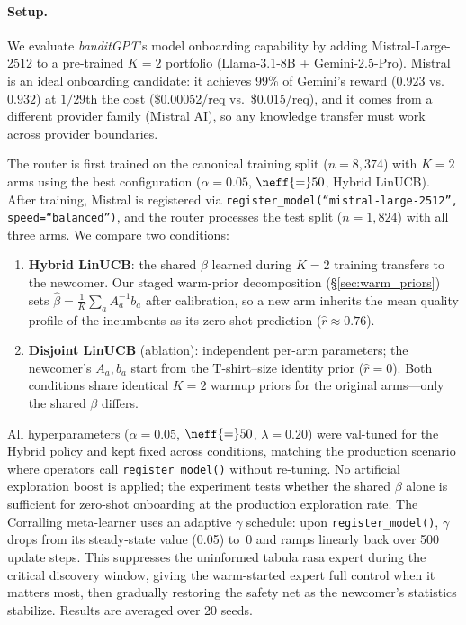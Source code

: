 
\paragraph{Setup.}
We evaluate \textit{banditGPT}'s model onboarding capability by
adding Mistral-Large-2512 to a pre-trained $K{=}2$ portfolio
(Llama-3.1-8B + Gemini-2.5-Pro).
Mistral is an ideal onboarding candidate: it achieves 99\% of
Gemini's reward ($0.923$ vs.\ $0.932$) at $1/29$th the cost
(\$0.00052/req vs.\ \$0.015/req), and it comes from a different
provider family (Mistral AI), so any knowledge transfer must work
across provider boundaries.

The router is first trained on the canonical training split
($n{=}8{,}374$) with $K{=}2$ arms using the best
configuration ($\alpha{=}0.05$, $\neff{=}50$, Hybrid LinUCB).
After training, Mistral is registered via
\texttt{register\_model(``mistral-large-2512'', speed=``balanced'')},
and the router processes the test split ($n{=}1{,}824$) with all
three arms.  We compare two conditions:
\begin{enumerate}[nosep]
    \item \textbf{Hybrid LinUCB}: the shared $\beta$ learned during
          $K{=}2$ training transfers to the newcomer.
          Our staged warm-prior decomposition
          (\S\ref{sec:warm_priors}) sets
          $\hat{\beta} = \frac{1}{K}\sum_a A_a^{-1}b_a$ after
          calibration, so a new arm inherits the mean quality profile
          of the incumbents as its zero-shot prediction
          ($\hat{r} \approx 0.76$).
    \item \textbf{Disjoint LinUCB} (ablation): independent per-arm
          parameters; the newcomer's $A_a, b_a$ start from
          the T-shirt--size identity prior ($\hat{r} = 0$).
          Both conditions share identical $K{=}2$ warmup priors for
          the original arms---only the shared $\beta$ differs.
\end{enumerate}
\noindent All hyperparameters ($\alpha{=}0.05$, $\neff{=}50$,
$\lambda{=}0.20$) were val-tuned for the Hybrid policy and kept
fixed across conditions, matching the production scenario where
operators call \texttt{register\_model()} without re-tuning.
No artificial exploration boost is applied; the
experiment tests whether the shared $\beta$ alone is sufficient for
zero-shot onboarding at the production exploration rate.
The Corralling meta-learner uses an adaptive $\gamma$ schedule:
upon \texttt{register\_model()}, $\gamma$ drops from its
steady-state value (0.05) to~0 and ramps linearly back over 500
update steps.  This suppresses the uninformed tabula rasa expert
during the critical discovery window, giving the warm-started
expert full control when it matters most, then gradually restoring
the safety net as the newcomer's statistics stabilize.
Results are averaged over 20 seeds.

